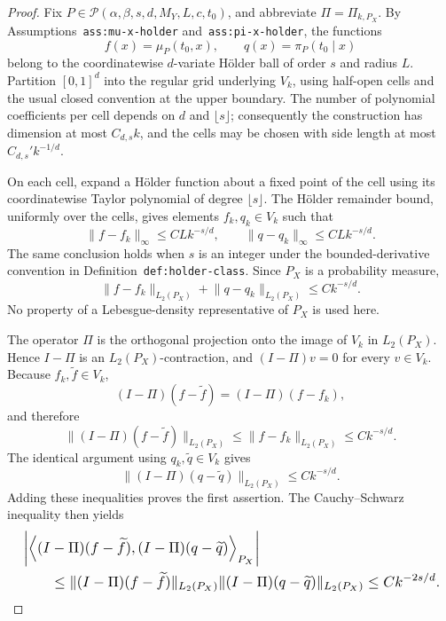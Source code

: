 \documentclass{article}
\begin{document}
\begin{proof}
Fix \(P\in\mathcal P(\alpha,\beta,s,d,M_Y,L,c,t_0)\), and abbreviate \(\Pi=\Pi_{k,P_X}\). By Assumptions~\texttt{ass:mu-x-holder} and~\texttt{ass:pi-x-holder}, the functions
\[
f(x)=\mu_P(t_0,x),\qquad q(x)=\pi_P(t_0\mid x)
\]
belong to the coordinatewise \(d\)-variate H\"older ball of order \(s\) and radius \(L\). Partition \([0,1]^d\) into the regular grid underlying \(V_k\), using half-open cells and the usual closed convention at the upper boundary. The number of polynomial coefficients per cell depends on \(d\) and \(\lfloor s\rfloor\); consequently the construction has dimension at most \(C_{d,s}k\), and the cells may be chosen with side length at most \(C_{d,s}'k^{-1/d}\).

On each cell, expand a H\"older function about a fixed point of the cell using its coordinatewise Taylor polynomial of degree \(\lfloor s\rfloor\). The H\"older remainder bound, uniformly over the cells, gives elements \(f_k,q_k\in V_k\) such that
\[
\lVert f-f_k\rVert_\infty\le C L k^{-s/d},
\qquad
\lVert q-q_k\rVert_\infty\le C L k^{-s/d}.
\]
The same conclusion holds when \(s\) is an integer under the bounded-derivative convention in Definition~\texttt{def:holder-class}. Since \(P_X\) is a probability measure,
\[
\lVert f-f_k\rVert_{L_2(P_X)}+
\lVert q-q_k\rVert_{L_2(P_X)}
\le C k^{-s/d}.
\]
No property of a Lebesgue-density representative of \(P_X\) is used here.

The operator \(\Pi\) is the orthogonal projection onto the image of \(V_k\) in \(L_2(P_X)\). Hence \(I-\Pi\) is an \(L_2(P_X)\)-contraction, and \((I-\Pi)v=0\) for every \(v\in V_k\). Because \(f_k,\widetilde f\in V_k\),
\[
(I-\Pi)(f-\widetilde f)=(I-\Pi)(f-f_k),
\]
and therefore
\[
\lVert(I-\Pi)(f-\widetilde f)\rVert_{L_2(P_X)}
\le \lVert f-f_k\rVert_{L_2(P_X)}
\le Ck^{-s/d}.
\]
The identical argument using \(q_k,\widetilde q\in V_k\) gives
\[
\lVert(I-\Pi)(q-\widetilde q)\rVert_{L_2(P_X)}
\le Ck^{-s/d}.
\]
Adding these inequalities proves the first assertion. The Cauchy--Schwarz inequality then yields
\[
\makebox[\linewidth][c]{\resizebox{0.98\linewidth}{!}{\(\displaystyle \begin{aligned}
&\left\lvert
\left\langle(I-\Pi)(f-\widetilde f),
(I-\Pi)(q-\widetilde q)\right\rangle_{P_X}
\right\rvert\\
&\qquad\le
\lVert(I-\Pi)(f-\widetilde f)\rVert_{L_2(P_X)}
\lVert(I-\Pi)(q-\widetilde q)\rVert_{L_2(P_X)}
\le Ck^{-2s/d}.
\end{aligned}\)}}
\]


\end{proof}
\end{document}
